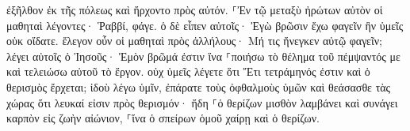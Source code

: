 \documentclass{openreader}
\begin{document}
ἐξῆλθον ἐκ τῆς πόλεως καὶ ἤρχοντο πρὸς αὐτόν. 
⸀Ἐν τῷ μεταξὺ ἠρώτων αὐτὸν οἱ μαθηταὶ λέγοντες· Ῥαββί, φάγε. 
ὁ δὲ εἶπεν αὐτοῖς· Ἐγὼ βρῶσιν ἔχω φαγεῖν ἣν ὑμεῖς οὐκ οἴδατε. 
ἔλεγον οὖν οἱ μαθηταὶ πρὸς ἀλλήλους· Μή τις ἤνεγκεν αὐτῷ φαγεῖν; 
λέγει αὐτοῖς ὁ Ἰησοῦς· Ἐμὸν βρῶμά ἐστιν ἵνα ⸀ποιήσω τὸ θέλημα τοῦ πέμψαντός με καὶ τελειώσω αὐτοῦ τὸ ἔργον. 
οὐχ ὑμεῖς λέγετε ὅτι Ἔτι τετράμηνός ἐστιν καὶ ὁ θερισμὸς ἔρχεται; ἰδοὺ λέγω ὑμῖν, ἐπάρατε τοὺς ὀφθαλμοὺς ὑμῶν καὶ θεάσασθε τὰς χώρας ὅτι λευκαί εἰσιν πρὸς θερισμόν· ἤδη 
⸀ὁ θερίζων μισθὸν λαμβάνει καὶ συνάγει καρπὸν εἰς ζωὴν αἰώνιον, ⸀ἵνα ὁ σπείρων ὁμοῦ χαίρῃ καὶ ὁ θερίζων. 
\end{document}
